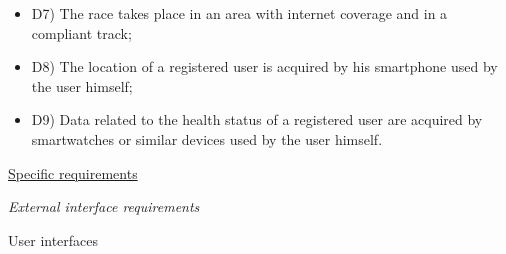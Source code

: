 \documentclass{article}
\begin{document}
\begin{legal}
\begin{legal}
\begin{legal}
{\begin{itemize}
				\item D7) The race takes place in an area with internet coverage and in a compliant track;\\
				\item D8) The location of a registered user is acquired by his smartphone used by the user himself;\\
				\item D9) Data related to the health status of a registered user are acquired by smartwatches or similar devices used by the user himself.\\
				\end{itemize}
			}
			\end{legal}
		\end{legal}
	
\newpage
	\item \underline{Specific requirements}
  		\begin{legal}
		\item \textit{External interface requirements}
			\begin{legal}
    		\item User interfaces \\\\
\end{legal}
\end{legal}
\end{legal}
\end{document}
